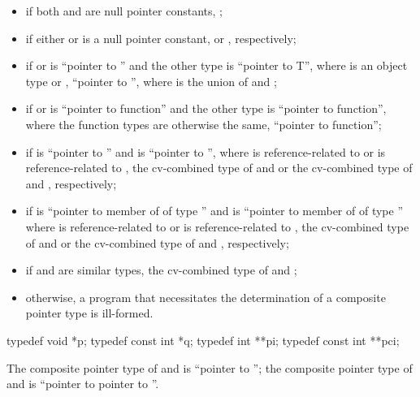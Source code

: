 \begin{itemize}
\item
if both  and  are null pointer constants,
;

\item
if either  or  is a null pointer constant,  or ,
respectively;

\item
if  or  is ``pointer to  '' and the
other type is ``pointer to  T'',
where  is an object type or ,
``pointer to  '',
where  is the union of  and ;

\item
if  or  is ``pointer to  function'' and the
other type is ``pointer to function'', where the function types are otherwise the same,
``pointer to function'';

\item
if  is ``pointer to  '' and  is ``pointer to
 '', where  is reference-related to  or  is
reference-related to , the cv-combined type
of  and  or the cv-combined type of  and ,
respectively;

\item
if  is ``pointer to member of  of type  '' and  is
``pointer to member of  of type  '' where  is
reference-related to  or  is reference-related to
, the cv-combined type of  and  or the cv-combined type
of  and , respectively;

\item
if  and  are similar types, the cv-combined type of  and
;

\item
otherwise, a program that necessitates the determination of a
composite pointer type is ill-formed.
\end{itemize}

\begin{example}
\begin{codeblock}
typedef void *p;
typedef const int *q;
typedef int **pi;
typedef const int **pci;
\end{codeblock}

The composite pointer type of  and  is ``pointer to ''; the
composite pointer type of  and  is ``pointer to  pointer to
''.
\end{example}

